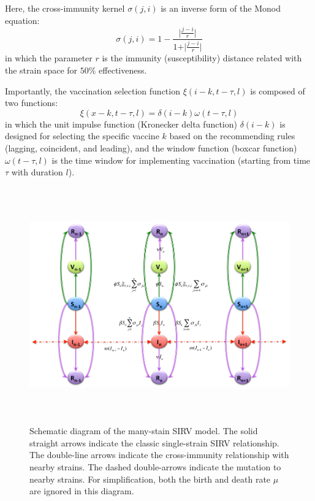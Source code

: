 \documentclass[preprint,12pt]{elsarticle}
\begin{document}
Here, the cross-immunity kernel \(\sigma(j,i)\) is an inverse form of the Monod equation:
\begin{equation}
  \label{eq:Immunity}
  \sigma(j,i) = 1 - \frac{\vert {\frac{j-i}{r}} \vert}{1 + \vert {\frac{j-i}{r}} \vert}
\end{equation}
in which the parameter \(r\) is the immunity (susceptibility) distance related with the strain space for \(50\%\) effectiveness. 

Importantly, the vaccination selection function \(\xi(i-k, t-\tau, l)\) is composed of two functions: 
\begin{equation}
  \label{eq:Selection}
  \xi(x-k, t-\tau, l) =  \delta(i-k) \omega(t-\tau, l)
\end{equation}
in which the unit impulse function (Kronecker delta function) \(\delta(i-k)\) is designed for selecting the specific vaccine \(k\) based on the recommending rules (lagging, coincident, and leading), and the window function (boxcar function) \(\omega(t-\tau, l)\) is the time window for implementing vaccination (starting from time \(\tau\) with duration \(l\)).


\newpage
\begin{figure}
  \centering
  \includegraphics[width=6in,height=4in]{figures/Diagram}
  \caption{Schematic diagram of the many-stain SIRV model.
  The solid straight arrows indicate the classic single-strain SIRV relationship.
  The double-line arrows indicate the cross-immunity relationship with nearby strains.
  The dashed double-arrows indicate the mutation to nearby strains. For simplification, both the birth and death rate \(\mu\) are ignored in this diagram.}
\label{fig:Diagram}
\end{figure}
\end{document}

